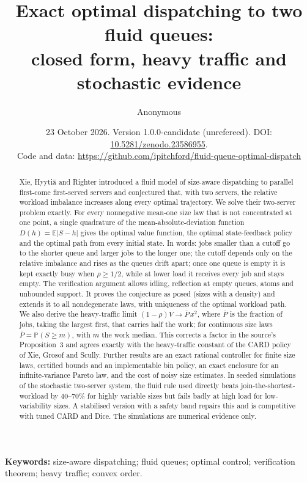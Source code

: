 \documentclass[11pt]{article}
\title{Exact optimal dispatching to two fluid queues:\\ closed form, heavy traffic and stochastic evidence}
\author{Anonymous}
\date{\small 23 October 2026. Version 1.0.0-candidate (unrefereed). DOI: \href{https://doi.org/10.5281/zenodo.23586955}{10.5281/zenodo.23586955}.\\
\small Code and data: \url{https://github.com/ipitchford/fluid-queue-optimal-dispatch}}
\numberwithin{equation}{section}
\theoremstyle{definition}
\theoremstyle{remark}
\newcommand{\E}{\mathbb{E}}
\newcommand{\Prob}{\mathbb{P}}
\begin{document}
\maketitle

\begin{abstract}
\noindent
Xie, Hyyti\"a and Righter introduced a fluid model of size-aware dispatching to parallel first-come first-served servers and conjectured that, with two servers, the relative workload imbalance increases along every optimal trajectory. We solve their two-server problem exactly. For every nonnegative mean-one size law that is not concentrated at one point, a single quadrature of the mean-absolute-deviation function $D(h)=\E|S-h|$ gives the optimal value function, the optimal state-feedback policy and the optimal path from every initial state. In words: jobs smaller than a cutoff go to the shorter queue and larger jobs to the longer one; the cutoff depends only on the relative imbalance and rises as the queues drift apart; once one queue is empty it is kept exactly busy when $\rho\ge1/2$, while at lower load it receives every job and stays empty. The verification argument allows idling, reflection at empty queues, atoms and unbounded support. It proves the conjecture as posed (sizes with a density) and extends it to all nondegenerate laws, with uniqueness of the optimal workload path. We also derive the heavy-traffic limit $(1-\rho)V\to\bar P\,x^2$, where $\bar P$ is the fraction of jobs, taking the largest first, that carries half the work; for continuous size laws $\bar P=\Prob(S\ge m)$, with $m$ the work median. This corrects a factor in the source's Proposition~3 and agrees exactly with the heavy-traffic constant of the CARD policy of Xie, Grosof and Scully. Further results are an exact rational controller for finite size laws, certified bounds and an implementable bin policy, an exact enclosure for an infinite-variance Pareto law, and the cost of noisy size estimates. In seeded simulations of the stochastic two-server system, the fluid rule used directly beats join-the-shortest-workload by 40--70\% for highly variable sizes but fails badly at high load for low-variability sizes. A stabilised version with a safety band repairs this and is competitive with tuned CARD and Dice. The simulations are numerical evidence only.
\end{abstract}

\noindent\textbf{Keywords:} size-aware dispatching; fluid queues; optimal control; verification theorem; heavy traffic; convex order.
\end{document}

